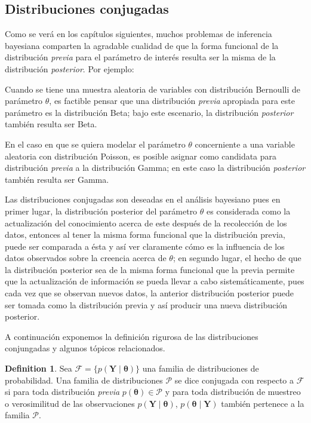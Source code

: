\documentclass[
  spanish,
  letter]{book}
\theoremstyle{definition}
\newtheorem{definition}{Definition}[chapter]
\theoremstyle{definition}
\theoremstyle{definition}
\theoremstyle{remark}
\begin{document}
\hypertarget{distribuciones-conjugadas}{%
\subsection{Distribuciones conjugadas}\label{distribuciones-conjugadas}}

Como se verá en los capítulos siguientes, muchos problemas de inferencia bayesiana comparten la agradable cualidad de que la forma funcional de la distribución \emph{previa} para el parámetro de interés resulta ser la misma de la distribución \emph{posterior}. Por ejemplo:

\item

Cuando se tiene una muestra aleatoria de variables con distribución Bernoulli de parámetro \(\theta\), es factible pensar que una distribución \emph{previa} apropiada para este parámetro es la distribución Beta; bajo este escenario, la distribución \emph{posterior} también resulta ser Beta.

\item

En el caso en que se quiera modelar el parámetro \(\theta\) concerniente a una variable aleatoria con distribución Poisson, es posible asignar como candidata para distribución \emph{previa} a la distribución Gamma; en este caso la distribución \emph{posterior} también resulta ser Gamma.

Las distribuciones conjugadas son deseadas en el análisis bayesiano pues en primer lugar, la distribución posterior del parámetro \(\theta\) es considerada como la actualización del conocimiento acerca de este después de la recolección de los datos, entonces al tener la misma forma funcional que la distribución previa, puede ser comparada a ésta y así ver claramente cómo es la influencia de los datos observados sobre la creencia acerca de \(\theta\); en segundo lugar, el hecho de que la distribución posterior sea de la misma forma funcional que la previa permite que la actualización de información se pueda llevar a cabo sistemáticamente, pues cada vez que se observan nuevos datos, la anterior distribución posterior puede ser tomada como la distribución previa y así producir una nueva distribución posterior.

A continuación exponemos la definición rigurosa de las distribuciones conjungadas y algunos tópicos relacionados.

\begin{definition}
\protect\hypertarget{def:unnamed-chunk-16}{}{\label{def:unnamed-chunk-16} }Sea \(\mathcal{F}=\{p(\mathbf{Y} \mid \boldsymbol \theta)\}\) una familia de distribuciones de probabilidad. Una familia de distribuciones \(\mathcal{P}\) se dice conjugada con respecto a \(\mathcal{F}\) si para toda distribución \emph{previa} \(p(\boldsymbol \theta) \in \mathcal{P}\) y para toda distribución de muestreo o verosimilitud de las observaciones \(p(\mathbf{Y} \mid \boldsymbol \theta)\), \(p(\boldsymbol \theta\mid \mathbf{Y})\) también pertenece a la familia \(\mathcal{P}\).
\end{definition}
\end{document}
